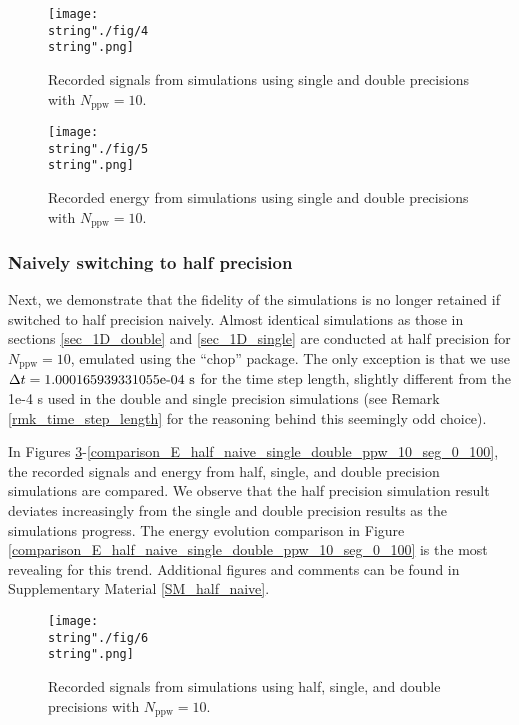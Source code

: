 \documentclass[10pt]{article}
\begin{document}
\begin{figure}[H]
\captionsetup{width=1\textwidth, font=footnotesize,labelfont=footnotesize}
\centering
%
\centering\texttt{[image: \\string"./fig/4\\string".png]}
%
\caption{Recorded signals from simulations using single and double precisions with $N_\text{ppw}=10$.}
\label{comparison_V_single_double_ppw_10}
\end{figure}


\begin{figure}[H]
\captionsetup{width=1\textwidth, font=footnotesize,labelfont=footnotesize}
\centering
%
\centering\texttt{[image: \\string"./fig/5\\string".png]}
%
\caption{Recorded energy from simulations using single and double precisions with $N_\text{ppw}=10$.}
\label{comparison_E_single_double_ppw_10}
\end{figure}


\subsubsection{Naively switching to half precision}\label{sec_1D_half_naive}
%
Next, we demonstrate that the fidelity of the simulations is no longer retained if switched to half precision naively. 
%
Almost identical simulations as those in sections \ref{sec_1D_double} and \ref{sec_1D_single} are conducted at half precision for $N_\text{ppw} = 10$, emulated using the ``chop'' package.
%
The only exception is that we use $\Delta t = \text{\rm1.000165939331055e-04 s}$ for the time step length, slightly different from the {\rm 1e-4 s} used in the double and single precision simulations (see Remark \ref{rmk_time_step_length} for the reasoning behind this seemingly odd choice). 


In Figures \ref{comparison_V_half_naive_single_double_ppw_10_seg_0_2}-\ref{comparison_E_half_naive_single_double_ppw_10_seg_0_100}, the recorded signals and energy from half, single, and double precision simulations are compared.
%
We observe that the half precision simulation result deviates increasingly from the single and double precision results as the simulations progress.
%
The energy evolution comparison in Figure \ref{comparison_E_half_naive_single_double_ppw_10_seg_0_100} is the most revealing for this trend. 
%
Additional figures and comments can be found in Supplementary Material \ref{SM_half_naive}.


\begin{figure}[H]
\captionsetup{width=1\textwidth, font=footnotesize,labelfont=footnotesize}
\centering
%
\centering\texttt{[image: \\string"./fig/6\\string".png]}
%
\caption{Recorded signals from simulations using half, single, and double precisions with $N_\text{ppw}=10$.}
\label{comparison_V_half_naive_single_double_ppw_10_seg_0_2}
\end{figure}
\end{document}
